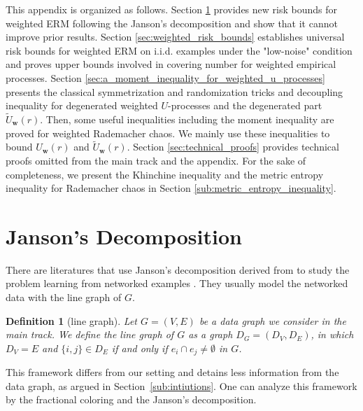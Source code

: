 \documentclass[letterpaper]{article} %
\newtheorem{definition}{Definition}
\newcommand{\weight}{\mathbf{w}}
\newcommand{\edge}[1]{\{#1\}}
\newcommand{\red}[1]{\textcolor{red}{#1}}
\newcommand{\todo}[1]{\red{\textsc{todo:} #1}}
\begin{document}
This appendix is organized as follows. Section \ref{sec:fractional_coloring_approach} 
provides new risk bounds for weighted ERM following the Janson's decomposition and show that it cannot improve prior results. 
Section \ref{sec:weighted_risk_bounds} establishes universal risk bounds for weighted ERM on i.i.d. examples under the "low-noise" condition and proves upper bounds involved in covering number for weighted empirical processes. 
Section \ref{sec:a_moment_inequality_for_weighted_u_processes} presents the classical symmetrization and randomization tricks and decoupling inequality for degenerated weighted $U$-processes and the degenerated part $\widetilde{U}_\weight{}(r)$.
Then, some useful inequalities including the moment inequality are proved for weighted Rademacher chaos.
We mainly use these inequalities to bound $U_\weight{}(r)$ and $\widetilde{U}_\weight{}(r)$.
Section \ref{sec:technical_proofs} provides technical proofs omitted from the main track and the appendix.
For the sake of completeness, we present the Khinchine inequality and the metric entropy inequality for Rademacher chaos in Section \ref{sub:metric_entropy_inequality}.

\section{Janson's Decomposition} %
\label{sec:fractional_coloring_approach}

There are literatures that use Janson's decomposition derived from \cite{janson2004large} to study the problem learning from networked examples \cite{Usunier2005,Biau2006,ralaivola2009chromatic,DBLP:conf/icml/RalaivolaA15}.
They usually model the networked data with the line graph of $G$.
\begin{definition}[line graph]
  \label{de:line graph}
  Let $G=(V,E)$ be a data graph we consider in the main track. We define the line graph of $G$ as a graph $D_G = (D_V, D_E)$, in which $D_V = E$ and $\edge{i,j}\in D_E$ if and only if $e_i\cap e_j\neq\emptyset$ in $G$.
\end{definition}
This framework differs from our setting and detains less information from the data graph, as argued in Section~\ref{sub:intiutions}. 
One can analyze this framework by the fractional coloring and the Janson's decomposition.
\end{document}
